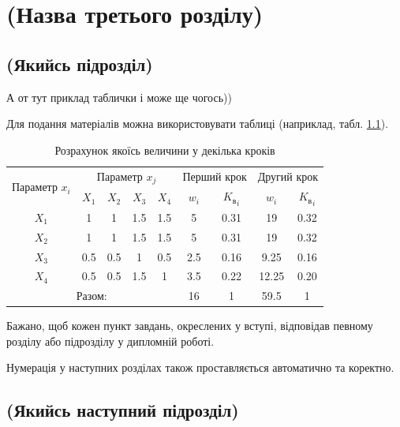\chapter{(Назва третього розділу)}
\label{chap:theory}

\section{(Якийсь підрозділ)}

А от тут приклад таблички і може ще чогось))

Для подання матеріалів можна використовувати таблиці (наприклад, 
табл. \ref{tab_weight}). 

    \begin{table}[ht]
    \caption{Розрахунок якоїсь величини у декілька кроків}
    \label{tab_weight}
    \centering
        \begin{tabular}{|c|c|c|c|c|c|c|c|c|}
        \hline \multirow{2}{*}{Параметр $x_i$} & \multicolumn{4}{c|}{Параметр $x_j$} & 
            \multicolumn{2}{c|}{Перший крок} & \multicolumn{2}{c|}{Другий крок} \\
        \cline{2-9} & $X_1$ & $X_2$ & $X_3$ & $X_4$ & $w_i$ & 
            ${K_\text{в}}_i$ & $w_i$ & ${K_\text{в}}_i$ \\
        \hline $X_1$ & 1 & 1 & 1.5 & 1.5 & 5 & 0.31 & 19 & 0.32 \\
        \hline $X_2$ & 1 & 1 & 1.5 & 1.5 & 5 & 0.31 & 19 & 0.32 \\
        \hline $X_3$ & 0.5 & 0.5 & 1 & 0.5 & 2.5 & 0.16 & 9.25 & 0.16 \\
        \hline $X_4$ & 0.5 & 0.5 & 1.5 & 1 & 3.5 & 0.22 & 12.25 & 0.20 \\
        \hline \multicolumn{5}{|c|}{Разом:} & 16 & 1 & 59.5 & 1 \\
        \hline
        \end{tabular}
    \end{table}

Бажано, щоб кожен пункт завдань, окреслених у вступі, відповідав певному 
розділу або підрозділу у дипломній роботі.

\begin{theorem}
Нумерація у наступних розділах також проставляється автоматично та коректно.
\end{theorem}

\section{(Якийсь наступний підрозділ)}


